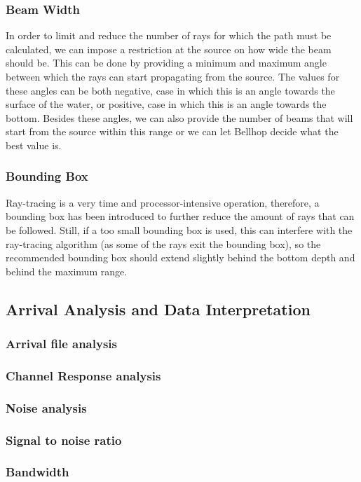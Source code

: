 \documentclass[a4paper]{IEEEtran}
\begin{document}
\subsubsection{Beam Width}
In order to limit and reduce the number of rays for which the path
must be calculated, we can impose a restriction at the source on how
wide the beam should be. This can be done by providing a minimum and
maximum angle between which the rays can start propagating from the
source. The values for these angles can be both negative, case in
which this is an angle towards the surface of the water, or
positive, case in which this is an angle towards the bottom. Besides
these angles, we can also provide the number of beams that will start
from the source within this range or we can let Bellhop decide what
the best value is.

\subsubsection{Bounding Box}
Ray-tracing is a very time and processor-intensive operation,
therefore, a bounding box has been introduced to further reduce the
amount of rays that can be followed. Still, if a too small bounding
box is used, this can interfere with the ray-tracing algorithm (as
some of the rays exit the bounding box), so the recommended bounding
box should extend slightly behind the bottom depth and behind the
maximum range.
\subsection{Arrival Analysis and Data Interpretation}

\subsubsection{Arrival file analysis}
\subsubsection{Channel Response analysis}
\subsubsection{Noise analysis}
\subsubsection{Signal to noise ratio}
\subsubsection{Bandwidth}
\end{document}
